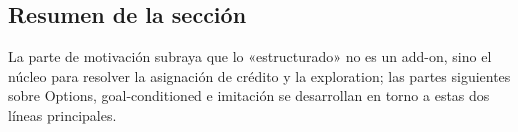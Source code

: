 \subsection{Resumen de la sección}

La parte de motivación subraya que lo «estructurado» no es un add-on, sino el núcleo para resolver la asignación de crédito y la exploration; las partes siguientes sobre Options, goal-conditioned e imitación se desarrollan en torno a estas dos líneas principales.
